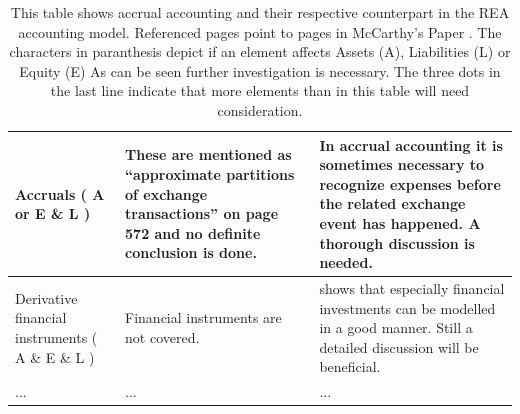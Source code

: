 \begin{table}
\begin{center}
\begin{tabular}{|p{}|p{}|p{}|}
	\hline
	Accruals ( A or E \& L ) & These are mentioned as “approximate partitions of exchange transactions” on  page 572 and no definite conclusion is done. & In accrual accounting it is sometimes necessary to recognize expenses before the related exchange event has happened. A thorough discussion is needed. \\ 
	\hline 
	Derivative financial instruments ( A \& E \& L )& Financial instruments are not covered. & 
	\cite{schwaiger2015aleandrea} shows that especially financial investments can be modelled in a good manner. Still a detailed discussion will be beneficial.
	\\
	\hline
	... & ... & ... \\
	\hline
\end{tabular} 
\end{center}
	\caption*{This table shows accrual accounting and their respective counterpart in the REA accounting model.
	Referenced pages point to pages in McCarthy's Paper \cite{mccarthy1982rea}.
     The characters in paranthesis depict if an element affects Assets (A), Liabilities (L) or Equity (E)
	 As can be seen further investigation is necessary. The three dots in the last line indicate that more elements than in this table will need consideration.}
\end{table}








